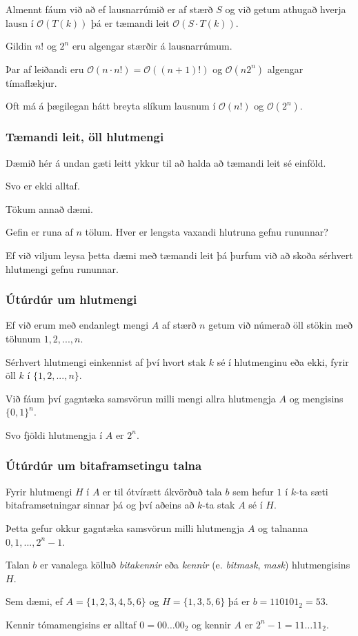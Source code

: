 {
	{
		\item<1-> Almennt fáum við að ef lausnarrúmið er af stærð $S$ og við getum athugað hverja lausn í $\mathcal{O}(T(k))$
			þá er tæmandi leit $\mathcal{O}(S \cdot T(k))$.
		\item<2-> Gildin $n!$ og $2^n$ eru algengar stærðir á lausnarrúmum.
		\item<3-> Þar af leiðandi eru $\mathcal{O}(n \cdot n!) = \mathcal{O}((n + 1)!)$ og $\mathcal{O}(n 2^n)$ algengar tímaflækjur.
		\item<4-> Oft má á þægilegan hátt breyta slíkum lausnum í $\mathcal{O}(n!)$ og $\mathcal{O}(2^n)$.
	}
}

{
	\frametitle{Tæmandi leit, öll hlutmengi}
	{
		\item<1-> Dæmið hér á undan gæti leitt ykkur til að halda að tæmandi leit sé einföld.
		\item<2-> Svo er ekki alltaf.
		\item<3-> Tökum annað dæmi.
		\item<4-> Gefin er runa af $n$ tölum. Hver er lengsta vaxandi hlutruna gefnu rununnar?
		\item<5-> Ef við viljum leysa þetta dæmi með tæmandi leit þá þurfum við að skoða sérhvert hlutmengi gefnu rununnar.
	}
}

{
	\frametitle{Útúrdúr um hlutmengi}
	{
		\item<1-> Ef við erum með endanlegt mengi $A$ af stærð $n$ getum við númerað öll stökin með tölunum $1, 2, ..., n$.
		\item<2-> Sérhvert hlutmengi einkennist af því hvort stak $k$ sé í hlutmenginu eða ekki, fyrir öll $k$ í $\{1, 2, ..., n\}$.
		\item<3-> Við fáum því gagntæka samsvörun milli mengi allra hlutmengja $A$ og mengisins $\{0, 1\}^n$.
 		\item<4-> Svo fjöldi hlutmengja í $A$ er $2^n$.
	}
}

{
	\frametitle{Útúrdúr um bitaframsetingu talna}
	{
		\item<1-> Fyrir hlutmengi $H$ í $A$ er til ótvírætt ákvörðuð tala $b$ sem hefur $1$ í
			$k$-ta sæti bitaframsetningar sinnar þá og því aðeins að $k$-ta stak $A$ sé í $H$.
		\item<2-> Þetta gefur okkur gagntæka samsvörun milli hlutmengja $A$ og talnanna $0, 1, ..., 2^n - 1$.
		\item<3-> Talan $b$ er vanalega kölluð \emph{bitakennir} eða \emph{kennir} (e. \emph{bitmask}, \emph{mask}) hlutmengisins $H$.
		\item<4-> Sem dæmi, ef $A = \{1, 2, 3, 4, 5, 6\}$ og $H = \{1, 3, 5, 6\}$ þá er $b = 110101_2 = 53$.
		\item<5-> Kennir tómamengisins er alltaf $0 = 00\! \dots\! 00_2$ og kennir $A$ er $2^n - 1 = 11\! \dots\! 11_2$.
	}
}


